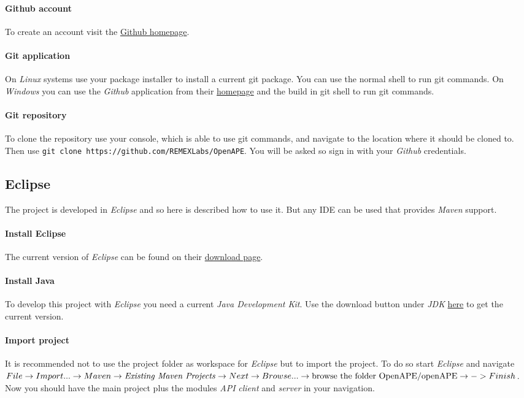 \documentclass[10pt]{article}
\begin{document}
\paragraph{Github account} To create an account visit the \href{https://github.com/}{Github homepage}.
\paragraph{Git application} On \emph{Linux} systems use your package installer to install a current git package. You can use the normal shell to run git commands. On \emph{Windows} you can use the \emph{Github} application from their \href{https://github.com/}{homepage} and the build in git shell to run git commands.
\paragraph{Git repository} To clone the repository use your console, which is able to use git commands, and navigate to the location where it should be cloned to. Then use \texttt{git clone https://github.com/REMEXLabs/OpenAPE}. You will be asked so sign in with your \emph{Github} credentials.
\subsection{Eclipse}
The project is developed in \emph{Eclipse} and so here is described how to use it. But any IDE can be used that provides \emph{Maven} support.
\paragraph{Install Eclipse} The current version of \emph{Eclipse} can be found on their \href{https://eclipse.org/downloads/}{download page}.
\paragraph{Install Java} To develop this project with \emph{Eclipse} you need a current \emph{Java Development Kit}. Use the download button under \emph{JDK} \href{http://www.oracle.com/technetwork/java/javase/downloads/index.html}{here} to get the current version.
\paragraph{Import project} It is recommended not to use the project folder as workspace for \emph{Eclipse} but to import the project. To do so start \emph{Eclipse} and navigate $File \rightarrow Import... \rightarrow Maven \rightarrow \text{\emph{Existing Maven Projects}} \rightarrow Next \rightarrow Browse... \rightarrow \text{browse the folder OpenAPE/openAPE} \rightarrow -> Finish$. Now you should have the main project plus the modules \emph{API} \emph{client} and \emph{server} in your navigation.
\end{document}

